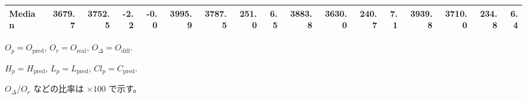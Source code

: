 \begin{threeparttable}
{\begin{tabular}{lrrrrrrrrrrrrrrrr}
 Median & 3679.7 & 3752.5 &       -2.2 &           -0.0 & 3995.9 & 3787.5 &      251.0 &            6.5 & 3883.8 & 3630.0 &      240.7 &            7.1 & 3939.8 & 3710.0 &       234.8 &              6.4 \\
\bottomrule
\end{tabular}
}
\begin{tablenotes}\footnotesize
\item $O_p=O_{\text{pred}}$, $O_r=O_{\text{real}}$, $O_\Delta=O_{\text{diff}}$.
\item $H_p=H_{\text{pred}}$, $L_p=L_{\text{pred}}$, $Cl_p=C_{\text{pred}}$.
\item $O_\Delta/O_r$ などの比率は \(\times100\) で示す。
\end{tablenotes}
\end{threeparttable}
\endgroup
